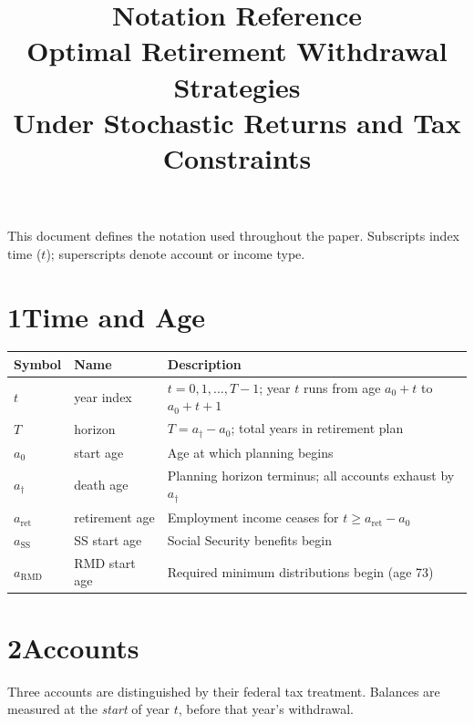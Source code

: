 \documentclass[12pt]{article}
\title{Notation Reference\\[4pt]
       \large Optimal Retirement Withdrawal Strategies\\
       Under Stochastic Returns and Tax Constraints}
\author{}
\date{}
\begin{document}
\maketitle
\thispagestyle{empty}

This document defines the notation used throughout the paper.
Subscripts index time ($t$); superscripts denote account or income type.

\section*{1\quad Time and Age}

\begin{tabular}{@{} L{2.6cm} L{4.4cm} L{6.5cm} @{}}
\toprule
\textbf{Symbol} & \textbf{Name} & \textbf{Description} \\
\midrule
$t$ & year index & $t = 0, 1, \ldots, T-1$; year $t$ runs from
      age $a_0 + t$ to $a_0 + t + 1$ \\[3pt]
$T$ & horizon & $T = a_\dagger - a_0$; total years in retirement plan \\[3pt]
$a_0$ & start age & Age at which planning begins \\[3pt]
$a_\dagger$ & death age & Planning horizon terminus; all accounts exhaust by $a_\dagger$ \\[3pt]
$a_{\mathrm{ret}}$ & retirement age & Employment income ceases for $t \geq a_{\mathrm{ret}} - a_0$ \\[3pt]
$a_{\mathrm{SS}}$ & SS start age & Social Security benefits begin \\[3pt]
$a_{\mathrm{RMD}}$ & RMD start age & Required minimum distributions begin (age 73) \\
\bottomrule
\end{tabular}

\section*{2\quad Accounts}

Three accounts are distinguished by their federal tax treatment.
Balances are measured at the \emph{start} of year $t$, before that year's withdrawal.
\end{document}
